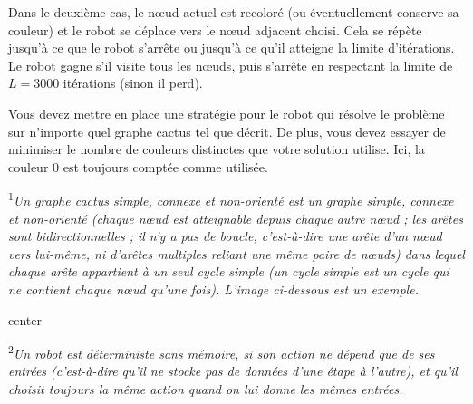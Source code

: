\documentclass[12pt]{article}
\begin{document}
Dans le deuxième cas, le nœud actuel est recoloré (ou éventuellement conserve sa couleur) et le robot se déplace vers le nœud adjacent choisi. Cela se répète jusqu'à ce que le robot s'arrête ou jusqu'à ce qu'il atteigne la limite d'itérations. Le robot gagne s'il visite tous les nœuds, puis s'arrête en respectant la limite de $L = 3000$ itérations (sinon il perd).

Vous devez mettre en place une stratégie pour le robot qui résolve le problème sur n'importe quel graphe cactus tel que décrit. De plus, vous devez essayer de minimiser le nombre de couleurs distinctes que votre solution utilise. Ici, la couleur $0$ est toujours comptée comme utilisée.

\textsuperscript{1}\textit{Un graphe cactus simple, connexe et non-orienté est un graphe simple, connexe et non-orienté (chaque nœud est atteignable depuis chaque autre nœud ; les arêtes sont bidirectionnelles ; il n'y a pas de boucle, c'est-à-dire une arête d'un nœud vers lui-même, ni d'arêtes multiples reliant une même paire de nœuds) dans lequel chaque arête appartient à un seul cycle simple (un cycle simple est un cycle qui ne contient chaque nœud qu'une fois). L'image ci-dessous est un exemple.}

\begin{adjustbox}{center}
	
\end{adjustbox}

\textsuperscript{2}\textit{Un robot est déterministe sans mémoire, si son action ne dépend que de ses entrées (c'est-à-dire qu'il ne stocke pas de données d'une étape à l'autre), et qu'il choisit toujours la même action quand on lui donne les mêmes entrées.}
\end{document}
